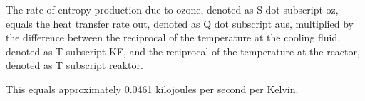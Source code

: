 The rate of entropy production due to ozone, denoted as S dot subscript oz, equals the heat transfer rate out, denoted as Q dot subscript aus, multiplied by the difference between the reciprocal of the temperature at the cooling fluid, denoted as T subscript KF, and the reciprocal of the temperature at the reactor, denoted as T subscript reaktor.

This equals approximately 0.0461 kilojoules per second per Kelvin.